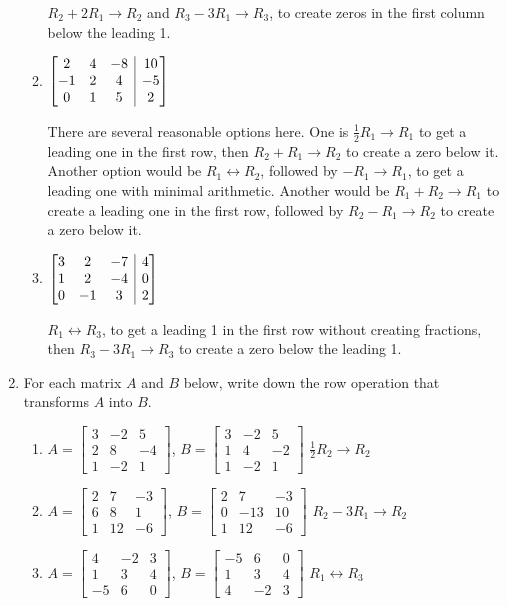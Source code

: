 \documentclass[12pt]{article}
\makeatletter
\newenvironment{amatrix}[1]{%
  \left[\begin{array}{@{}*{#1}{c}|c@{}}
}{%
  \end{array}\right]
}
\newcommand{\bbm}{\begin{bmatrix}}
\newcommand{\ebm}{\end{bmatrix}}
\newcommand{\bam}{\begin{amatrix}}
\newcommand{\eam}{\end{amatrix}}
\makeatother
\begin{document}
\begin{enumerate}
\begin{enumerate}
$R_2+2R_1\to R_2$ and 
$R_3-3R_1\to R_3$, to create zeros in the first column below the leading 1.

\item $\bam{3} 2&4&-8&10\\-1&2&4&-5\\0&1&5&2\eam$

There are several reasonable options here. One is $\frac12 R_1\to R_1$ to get a leading one in the first row, then $R_2+R_1\to R_2$ to create a zero below it. Another option would be $R_1\leftrightarrow R_2$, followed by $-R_1\to R_1$, to get a leading one with minimal arithmetic. Another would be $R_1+R_2\to R_1$ to create a leading one in the first row, followed by $R_2-R_1\to R_2$ to create a zero below it.

\item $\bam{3} 3&2&-7&4\\1&2&-4&0\\0&-1&3&2\eam$

$R_1\leftrightarrow R_3$, to get a leading 1 in the first row without creating fractions, then $R_3-3R_1\to R_3$ to create a zero below the leading 1.
\end{enumerate}

\bigskip

\item For each matrix $A$ and $B$ below, write down the row operation that transforms $A$ into $B$.

\begin{enumerate}
\item $A = \bbm 3&-2&5\\2&8&-4\\1&-2&1\ebm$, $B = \bbm 3&-2&5\\1&4&-2\\1&-2&1\ebm$ \hspace{1cm} $\frac12 R_2\to R_2$

\bigskip

\item $A = \bbm 2&7&-3\\6&8&1\\1&12&-6\ebm$, $B = \bbm 2&7&-3\\0&-13&10\\1&12&-6\ebm$ \hspace{1cm} $R_2-3R_1\to R_2$

\bigskip

\item $A = \bbm 4&-2&3\\1&3&4\\-5&6&0\ebm$, $B = \bbm -5&6&0\\1&3&4\\4&-2&3\ebm$ \hspace{1cm} $R_1\leftrightarrow R_3$


\end{enumerate}
\end{enumerate}
\end{document}
